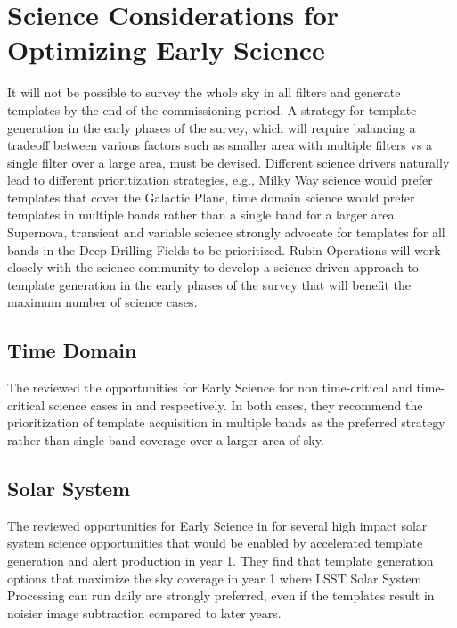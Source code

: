 \section{Science Considerations for Optimizing Early Science} \label{sec:science}

It will not be possible to survey the whole sky in all filters and generate templates by the end of the commissioning period.
A strategy for template generation in the early phases of the survey, which will require balancing a tradeoff between various factors such as smaller area with multiple filters vs a single filter over a large area, must be devised.
Different science drivers naturally lead to different prioritization strategies, e.g., Milky Way science would prefer templates that cover the Galactic Plane, time domain science would prefer templates in multiple bands rather than a single band for a larger area.
Supernova, transient and variable science strongly advocate for templates for all bands in the Deep Drilling Fields to be prioritized.
Rubin Operations will work closely with the science community to develop a science-driven approach to template generation in the early phases of the survey that will benefit the maximum number of science cases.

\subsection{Time Domain}

The \tvssc reviewed the opportunities for Early Science  for non time-critical and time-critical science cases in \citep{Hambleton_2020} and \citep{Street_2020} respectively.
In both cases, they recommend the prioritization of template acquisition in multiple bands as the preferred strategy rather than single-band  coverage over a larger area of sky.

\subsection{Solar System}

The \sssc reviewed opportunities for Early Science  in \citep{2020arXiv201005926L} for several high impact solar system science opportunities that would be enabled by accelerated template generation and alert production in year 1.
They find that template generation options that maximize the sky coverage in year 1 where LSST Solar System Processing can run daily are strongly preferred, even if the templates result in noisier image subtraction compared to later years.

